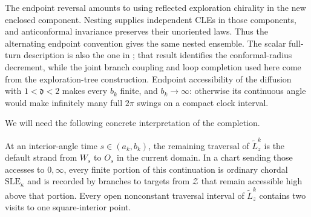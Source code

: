 The endpoint reversal amounts to using reflected exploration chirality
in the new enclosed component.  Nesting supplies independent CLEs in
those components, and anticonformal invariance preserves their
unoriented laws.  Thus the alternating endpoint convention gives the
same nested ensemble.  The scalar full-turn description is also the
one in \citet[Proposition~2]{SchrammSheffieldWilson2009}; that result
identifies the conformal-radius decrement, while the joint branch
coupling and loop completion used here come from the exploration-tree
construction.  Endpoint accessibility of the diffusion with
$1<\mathfrak d<2$ makes every $b_k$ finite, and $b_k\to\infty$:
otherwise its continuous angle would make infinitely many full
$2\pi$ swings on a compact clock interval.

We will need the following concrete interpretation of the completion.

\begin{lemma}
\label{loop:continuation}
At an interior-angle time $s\in(a_k,b_k)$, the remaining traversal
of $\widetilde L_z^k$ is the default strand from $W_s$ to $O_s$ in
the current domain.  In a chart sending those accesses to $0,\infty$,
every finite portion of this continuation is ordinary chordal
$\mathrm{SLE}_\kappa$ and is recorded by branches to targets from
$\mathcal Z$ that remain accessible high above that portion.
Every open nonconstant traversal interval of $\widetilde L_z^k$
contains two visits to one square-interior point.
\end{lemma}


